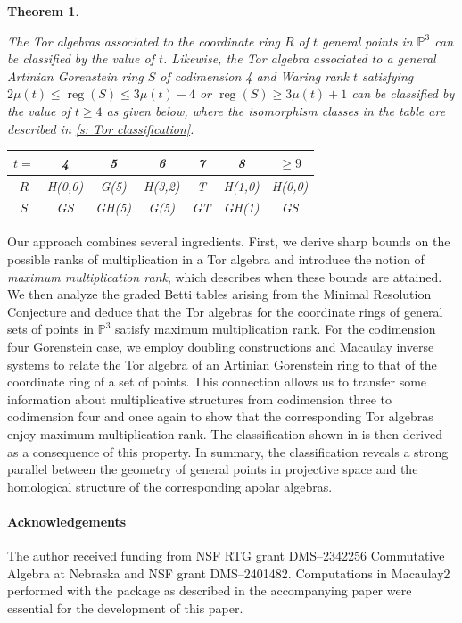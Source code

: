 \documentclass[reqno]{amsart}
\DeclareMathOperator{\reg}{reg}
\renewcommand{\P}{\mathbb{P}}
\theoremstyle{plain} %
\newtheorem{theorem}{Theorem}[section] %
\theoremstyle{definition}
\theoremstyle{remark}
\begin{document}
\begin{theorem}\label{full_theorem}

The Tor algebras associated to the coordinate ring $R$ of $t$ general points in $\P^3$ can be classified by the value of $t$. Likewise, the Tor algebra associated to a general Artinian Gorenstein ring $S$ of codimension 4 and Waring rank $t$ satisfying $2\mu(t)\leq\reg(S)\leq 3\mu(t)-4$ or $\reg(S)\geq 3\mu(t)+1$ can be classified by the value of $t\geq 4$ as given below, where the isomorphism classes in the table  are described in  \cref{s: Tor classification}.


\begin{center}

    \begin{tabular}{|c|c c c c c c|}
    \hline
    $t=$ & 4&5&6&7&8&$\geq9$ \\  
    \hline
    $R$ &   H(0,0)&  G(5)&  H(3,2)&  T&  H(1,0)&  H(0,0) \\
    $S$ & GS&GH(5)&G(5)&GT&GH(1)&GS\\
    \hline
  \end{tabular}
\end{center}
\end{theorem}

Our approach combines several ingredients. First, we  derive sharp bounds on
the possible ranks of multiplication in a Tor algebra and introduce the
notion of \emph{maximum multiplication rank}, which describes when these bounds
are attained. We then analyze the graded Betti
tables arising from the Minimal Resolution Conjecture and deduce that the Tor algebras for the coordinate rings of general sets of points in $\P^3$ satisfy maximum multiplication rank. For the codimension four Gorenstein case, we employ doubling
constructions and Macaulay inverse systems to relate the Tor algebra of an
Artinian Gorenstein ring to that of the coordinate ring of a set of points. This connection allows us to transfer some information about multiplicative
structures from codimension three to codimension four and once again to show that the corresponding Tor algebras enjoy maximum multiplication rank. The classification shown in  is then derived as a consequence of this property.
In summary, the classification reveals a strong parallel between the geometry
of general points in projective space and the homological structure of the
corresponding apolar algebras.


\paragraph{\bf Acknowledgements} The author received funding from NSF RTG grant DMS--2342256 Commutative Algebra at Nebraska and NSF grant DMS--2401482. Computations in Macaulay2 \cite{M2} performed with the package \cite{TorAlgebraSource} as described in the accompanying paper \cite{TorAlgebraArticle} were essential for the development of this paper.
\end{document}
